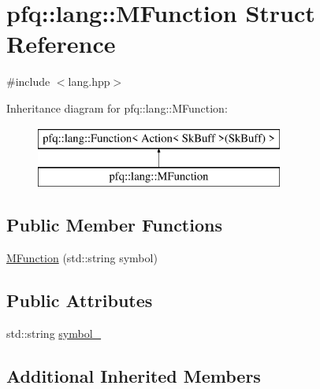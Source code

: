 \hypertarget{structpfq_1_1lang_1_1MFunction}{\section{pfq\+:\+:lang\+:\+:M\+Function Struct Reference}
\label{structpfq_1_1lang_1_1MFunction}
}


{\ttfamily \#include $<$lang.\+hpp$>$}

Inheritance diagram for pfq\+:\+:lang\+:\+:M\+Function\+:\begin{figure}[H]
\begin{center}
\leavevmode
\includegraphics[height=2.000000cm]{structpfq_1_1lang_1_1MFunction}
\end{center}
\end{figure}
\subsection*{Public Member Functions}
\begin{DoxyCompactItemize}
\item 
\hyperlink{structpfq_1_1lang_1_1MFunction_af6a48f74323549dd325447dd5aea00cf}{M\+Function} (std\+::string symbol)
\end{DoxyCompactItemize}
\subsection*{Public Attributes}
\begin{DoxyCompactItemize}
\item 
std\+::string \hyperlink{structpfq_1_1lang_1_1MFunction_a109c0f1d69464f636c72845072a08a16}{symbol\+\_\+}
\end{DoxyCompactItemize}
\subsection*{Additional Inherited Members}


